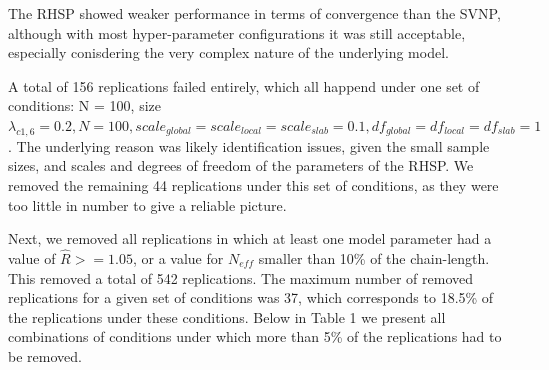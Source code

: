 \documentclass[
  english,
  man, donotrepeattitle,floatsintext]{apa6}
\begin{document}
The RHSP showed weaker performance in terms of convergence than the SVNP, although with most hyper-parameter configurations it was still acceptable, especially conisdering the very complex nature of the underlying model.

A total of 156 replications failed entirely, which all happend under one set of conditions: N = 100, size \(\lambda_{c1,6} = 0.2, N = 100, scale_{global} = scale_{local} = scale_{slab} = 0.1, df_{global} = df_{local} = df_{slab} = 1\). The underlying reason was likely identification issues, given the small sample sizes, and scales and degrees of freedom of the parameters of the RHSP. We removed the remaining 44 replications under this set of conditions, as they were too little in number to give a reliable picture.

Next, we removed all replications in which at least one model parameter had a value of \(\hat{R} >= 1.05\), or a value for \(N_{eff}\) smaller than 10\% of the chain-length. This removed a total of 542 replications. The maximum number of removed replications for a given set of conditions was 37, which corresponds to 18.5\% of the replications under these conditions. Below in Table 1 we present all combinations of conditions under which more than 5\% of the replications had to be removed.
\end{document}
